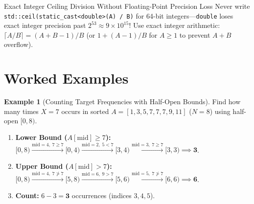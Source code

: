 \documentclass[11pt,a4paper]{article}
\theoremstyle{definition}
\newtheorem{example}{Example}[section]
\begin{document}
\begin{calloutbox}{Exact Integer Ceiling Division Without Floating-Point Precision Loss}
Never write \texttt{std::ceil(static\_cast<double>(A) / B)} for 64-bit integers---\texttt{double} loses exact integer precision past $2^{53} \approx 9 \times 10^{15}$! Use exact integer arithmetic: $\lceil A / B \rceil = (A + B - 1) / B$ (or $1 + (A - 1) / B$ for $A \ge 1$ to prevent $A + B$ overflow).
\end{calloutbox}

\section{Worked Examples}

\begin{example}[Counting Target Frequencies with Half-Open Bounds]
Find how many times $X = 7$ occurs in sorted $A = [1, 3, 5, 7, 7, 7, 9, 11]$ ($N = 8$) using half-open $[0, 8)$.
\begin{enumerate}
    \item \textbf{Lower Bound ($A[\text{mid}] \ge 7$):}
    $[0, 8) \xrightarrow{\text{mid}=4,\; 7 \ge 7} [0, 4) \xrightarrow{\text{mid}=2,\; 5 < 7} [3, 4) \xrightarrow{\text{mid}=3,\; 7 \ge 7} [3, 3) \implies \mathbf{3}$.
    \item \textbf{Upper Bound ($A[\text{mid}] > 7$):}
    $[0, 8) \xrightarrow{\text{mid}=4,\; 7 \ngtr 7} [5, 8) \xrightarrow{\text{mid}=6,\; 9 > 7} [5, 6) \xrightarrow{\text{mid}=5,\; 7 \ngtr 7} [6, 6) \implies \mathbf{6}$.
    \item \textbf{Count:} $6 - 3 = \mathbf{3}$ occurrences (indices $3, 4, 5$).
\end{enumerate}
\end{example}
\end{document}
